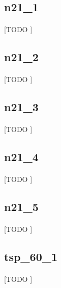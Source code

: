 \documentclass[spanish]{article}
\begin{document}
		\subsection{n21\_1}

			\paragraph{}
			[TODO ]

		\subsection{n21\_2}

			\paragraph{}
			[TODO ]

		\subsection{n21\_3}

			\paragraph{}
			[TODO ]

		\subsection{n21\_4}

			\paragraph{}
			[TODO ]

		\subsection{n21\_5}

			\paragraph{}
			[TODO ]

		\subsection{tsp\_60\_1}

			\paragraph{}
			[TODO ]
\end{document}
